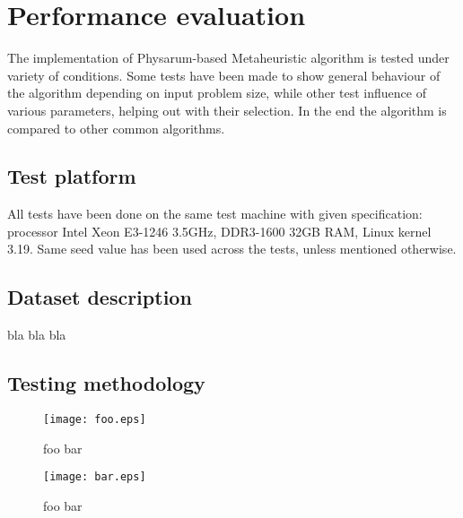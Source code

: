 \section{Performance evaluation}
\label{section:project_evaluation}

The implementation of Physarum-based Metaheuristic algorithm is tested under variety of conditions. Some tests have been made to show general behaviour of the algorithm depending on input problem size, while other test influence of various parameters, helping out with their selection. In the end the algorithm is compared to other common algorithms.


\subsection{Test platform}

All tests have been done on the same test machine with given specification: processor Intel Xeon E3-1246 3.5GHz, DDR3-1600 32GB RAM, Linux kernel 3.19. Same seed value has been used across the tests, unless mentioned otherwise.


\subsection{Dataset description}

bla bla bla

\subsection{Testing methodology}

\begin{figure}
  \centering

  \texttt{[image: foo.eps]}

  \caption{foo bar}

\end{figure}

\begin{figure}
  \centering

  \texttt{[image: bar.eps]}

  \caption{foo bar}

\end{figure}


